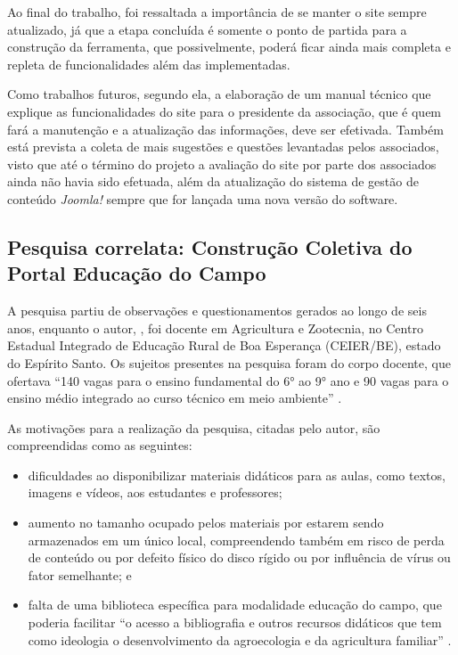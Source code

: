Ao final do trabalho, foi ressaltada a importância de se manter o site sempre atualizado, já que a etapa concluída é somente o ponto de partida para a construção da ferramenta, que possivelmente, poderá ficar ainda mais completa e repleta de funcionalidades além das implementadas. 

Como trabalhos futuros, segundo ela, a elaboração de um manual técnico que explique as funcionalidades do site para o presidente da associação, que é quem fará a manutenção e a atualização das informações, deve ser efetivada. Também está prevista a coleta de mais sugestões e questões levantadas pelos associados, visto que até o término do projeto a avaliação do site por parte dos associados ainda não havia sido efetuada, além da atualização do sistema de gestão de conteúdo \textit{Joomla!} sempre que for lançada uma nova versão do software.


\hspace{2.5cm}
\subsection{Pesquisa correlata: Construção Coletiva do Portal Educação do Campo}
\hspace{2.5cm}

A pesquisa partiu de observações e questionamentos gerados ao longo de seis anos, enquanto o autor, , foi docente em Agricultura e Zootecnia, no Centro Estadual Integrado de Educação Rural de Boa Esperança (CEIER/BE), estado do Espírito Santo. Os sujeitos presentes na pesquisa foram do corpo docente, que ofertava ``140 vagas para o ensino fundamental do 6° ao 9° ano e 90 vagas para o ensino médio integrado ao curso técnico em meio ambiente'' \cite{soares2017construccao}.

As motivações para a realização da pesquisa, citadas pelo autor, são compreendidas como as seguintes: 

\begin{itemize}
 \item dificuldades ao disponibilizar materiais didáticos para as aulas, como textos, imagens e vídeos, aos estudantes e professores;

 \item aumento no tamanho ocupado pelos materiais por estarem sendo armazenados em um único local, compreendendo também em risco de perda de conteúdo ou por defeito físico do disco rígido ou por influência de vírus ou fator semelhante; e
 
 \item falta de uma biblioteca específica para modalidade educação do campo, que poderia facilitar ``o acesso a bibliografia e outros recursos didáticos que tem como ideologia o desenvolvimento da agroecologia e da agricultura familiar'' \cite{soares2017construccao}.
\end{itemize}

